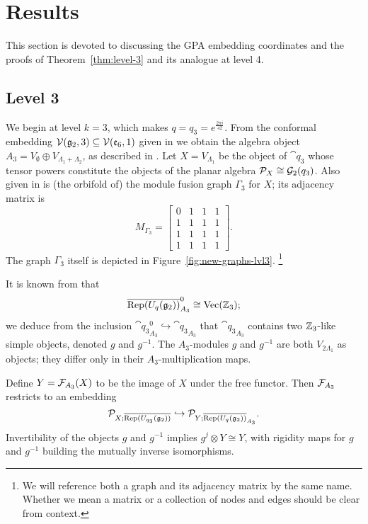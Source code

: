 \section{Results}\label{sec:results}
This section is devoted to discussing the GPA embedding coordinates
and the proofs of Theorem~\ref{thm:level-3} and its analogue at level 4.


\subsection{Level 3}\label{subsec:results-3}
We begin at level $k=3$, which makes $q=q_3=e^{\frac{2\pi i}{42}}$. 
From the conformal embedding $\mathcal{V}(\mathfrak{g}_2,3) \subseteq \mathcal{V}(\mathfrak{e}_6,1)$ given in \cite{DMNO} we obtain the 
algebra object $A_3 = V_{\emptyset} \oplus V_{\Lambda_1+\Lambda_2}$, as described in \cite{g2_graphs}. 
Let $X = V_{\Lambda_1}$ be the object of $\cat{q_3}$ whose tensor powers
constitute the objects of the planar algebra $\mathcal{P}_X \cong \mathcal{G}_2(q_3)$. 
Also given in \cite{g2_graphs} is (the orbifold of) the module fusion graph $\Gamma_3$ for $X$;
its adjacency matrix is
\[
    M_{\Gamma_3} = \begin{bmatrix} 0&1&1&1\\ 1&1&1&1\\ 1&1&1&1\\ 1&1&1&1\end{bmatrix}.
\]
The graph $\Gamma_3$ itself is depicted in Figure~\ref{fig:new-graphs-lvl3}.
\footnote{We will reference both a graph and its adjacency matrix by the same name. 
Whether we mean a matrix or a collection of nodes and edges should be clear from context.}

It is known from \cite{DMNO} that 
\[
    \overline{\operatorname{Rep}(U_{q}(\mathfrak{g}_2))}_{A_3}^0\cong \operatorname{Vec}(\mathbb{Z}_3);
\]
we deduce from the inclusion $\cat{q_3}_{A_3}^0 \hookrightarrow \cat{q_3}_{A_3}$ 
that $\cat{q_3}_{A_3}$ contains two $\mathbb{Z}_3$-like simple objects, denoted $g$ and $g^{-1}$. 
The $A_3$-modules $g$ and $g^{-1}$ are both $V_{2\Lambda_1}$ as objects; 
they differ only in their $A_3$-multiplication maps.


Define $Y=\mathcal{F}_{A_3}(X)$ to be the image of $X$ under the free functor. 
Then $\mathcal{F}_{A_3}$ restricts to an embedding 
\[
\mathcal{P}_{X;\overline{\operatorname{Rep}(U_{q_3}(\mathfrak{g}_2))}} \hookrightarrow \mathcal{P}_{Y;\overline{\operatorname{Rep}(U_{q}(\mathfrak{g}_2))}_{A_3}}.
\] 
Invertibility of the objects $g$ and $g^{-1}$ implies $g^{j}\otimes Y \cong Y$, 
with rigidity maps for $g$ and $g^{-1}$ building the mutually inverse isomorphisms.

